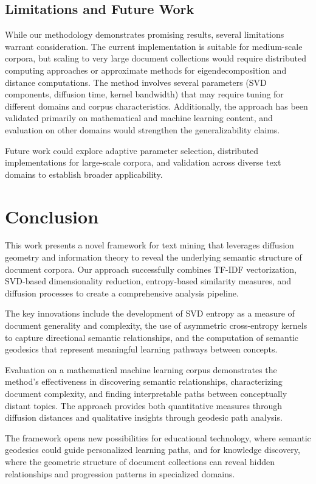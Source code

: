 \documentclass[12pt,a4paper]{article}
\begin{document}
\subsection{Limitations and Future Work}

While our methodology demonstrates promising results, several limitations warrant consideration. The current implementation is suitable for medium-scale corpora, but scaling to very large document collections would require distributed computing approaches or approximate methods for eigendecomposition and distance computations. The method involves several parameters (SVD components, diffusion time, kernel bandwidth) that may require tuning for different domains and corpus characteristics. Additionally, the approach has been validated primarily on mathematical and machine learning content, and evaluation on other domains would strengthen the generalizability claims.

Future work could explore adaptive parameter selection, distributed implementations for large-scale corpora, and validation across diverse text domains to establish broader applicability.

\section{Conclusion}

This work presents a novel framework for text mining that leverages diffusion geometry and information theory to reveal the underlying semantic structure of document corpora. Our approach successfully combines TF-IDF vectorization, SVD-based dimensionality reduction, entropy-based similarity measures, and diffusion processes to create a comprehensive analysis pipeline.

The key innovations include the development of SVD entropy as a measure of document generality and complexity, the use of asymmetric cross-entropy kernels to capture directional semantic relationships, and the computation of semantic geodesics that represent meaningful learning pathways between concepts.

Evaluation on a mathematical machine learning corpus demonstrates the method's effectiveness in discovering semantic relationships, characterizing document complexity, and finding interpretable paths between conceptually distant topics. The approach provides both quantitative measures through diffusion distances and qualitative insights through geodesic path analysis.

The framework opens new possibilities for educational technology, where semantic geodesics could guide personalized learning paths, and for knowledge discovery, where the geometric structure of document collections can reveal hidden relationships and progression patterns in specialized domains.
\end{document}
